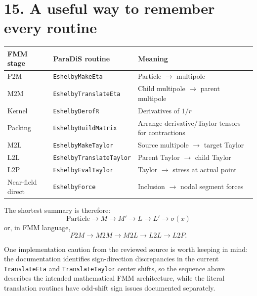 \documentclass[11pt,a4paper]{article}
\begin{document}
\section*{15. A useful way to remember every routine}
\begin{center}
\begin{tabular}{lll}
\toprule
\textbf{FMM stage} & \textbf{ParaDiS routine} & \textbf{Meaning}\\
\midrule
P2M & \texttt{EshelbyMakeEta} & Particle \(\rightarrow\) multipole\\
M2M & \texttt{EshelbyTranslateEta} & Child multipole \(\rightarrow\) parent multipole\\
Kernel & \texttt{EshelbyDerofR} & Derivatives of \(1/r\)\\
Packing & \texttt{EshelbyBuildMatrix} & Arrange derivative/Taylor tensors for contractions\\
M2L & \texttt{EshelbyMakeTaylor} & Source multipole \(\rightarrow\) target Taylor\\
L2L & \texttt{EshelbyTranslateTaylor} & Parent Taylor \(\rightarrow\) child Taylor\\
L2P & \texttt{EshelbyEvalTaylor} & Taylor \(\rightarrow\) stress at actual point\\
Near-field direct & \texttt{EshelbyForce} & Inclusion \(\rightarrow\) nodal segment forces\\
\bottomrule
\end{tabular}
\end{center}

The shortest summary is therefore:
\[\boxed{\text{Particle}\rightarrow M\rightarrow M'\rightarrow L\rightarrow L'\rightarrow\sigma(x)}\]
or, in FMM language,
\[\boxed{P2M\rightarrow M2M\rightarrow M2L\rightarrow L2L\rightarrow L2P.}\]

One implementation caution from the reviewed source is worth keeping in mind: the documentation identifies sign-direction discrepancies in the current \texttt{TranslateEta} and \texttt{TranslateTaylor} center shifts, so the sequence above describes the intended mathematical FMM architecture, while the literal translation routines have odd-shift sign issues documented separately.
\end{document}
